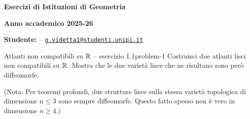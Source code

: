 \documentclass[letterpaper, 11pt]{extarticle}
\begin{document}
\begin{LARGE}
    \textsf{\textbf{Esercizi di Istituzioni di Geometria}}
\end{LARGE}

\vspace{0.2ex}

\begin{Large}
    \textsf{\textbf{Anno accademico 2025-26}}
\end{Large}

\vspace{1.5ex}

\begin{large}
    \textsf{\textbf{Studente:}}  --  \href{mailto:g.videtta1@studenti.unipi.it}{\texttt{g.videtta1@studenti.unipi.it}}
\end{large}

\vspace{-0.5ex}


\vspace{1ex}

\linespread{1.3}

\begin{problem}{Atlanti non compatibili su \texorpdfstring{$\mathbb{R}$}{ℝ} -- esercizio 1.1}{problem-1}
Costruisci due atlanti lisci non compatibili su $\mathbb{R}$.
Mostra che le due varietà lisce che ne risultano sono però diffeomorfe.


(Nota: Per teoremi profondi, due strutture lisce sulla stessa varietà topologica
di dimensione $n \leq 3$ sono sempre diffeomorfe. Questo fatto spesso non
è vero in dimensione $n \geq 4$.)
\end{problem}
\end{document}
